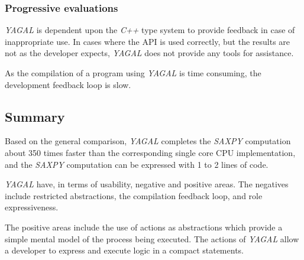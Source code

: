\subsubsection[*]{Progressive evaluations}
\textit{YAGAL} is dependent upon the \textit{C++} type system to provide feedback in case of inappropriate use. In cases where the API is used correctly, but the results are not as the developer expects, \textit{YAGAL} does not provide any tools for assistance.

As the compilation of a program using \textit{YAGAL} is time consuming, the development feedback loop is slow.

\subsection{Summary} \label{sec:yagalEvalSum}
Based on the general comparison, \textit{YAGAL} completes the \textit{SAXPY} computation about 350 times faster than the corresponding single core CPU implementation, and the \textit{SAXPY} computation can be expressed with 1 to 2 lines of code. 

\textit{YAGAL} have, in terms of usability, negative and positive areas. The negatives include restricted abstractions, the compilation feedback loop, and role expressiveness.

The positive areas include the use of actions as abstractions which provide a simple mental model of the process being executed. The actions of \textit{YAGAL} allow a developer to express and execute  logic in a compact statements.
